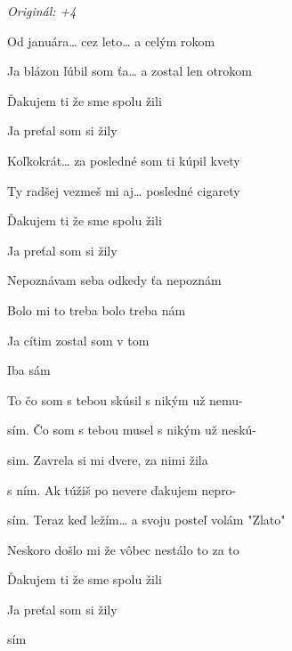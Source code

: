 \begin{song}


\begin{strumbox}
\textit{Originál: +4}
\end{strumbox}

\begin{hchordbox}
\end{hchordbox}

\Large

\bigskip


 Od januára… cez leto… a celým rokom \par
{} Ja blázon ľúbil som ťa… a zostal len otrokom \par
{}Ďakujem ti že sme spolu žili \par
Ja preťal som si žily \par

\bigskip

 Koľkokrát… za posledné som ti kúpil kvety \par
{} Ty radšej vezmeš mi aj… posledné cigarety \par
{}Ďakujem ti že sme spolu žili \par
Ja preťal som si žily \par

\bigskip

\begin{chorusbox}{\PredrefrenARefren}
Nepoznávam seba odkedy ťa nepoznám \par
{} Bolo mi to treba  bolo treba nám \par
{} Ja cítim zostal som v tom \par
Iba sám \par

\bigskip

 To čo som s tebou skúsil  s nikým už nemu- \par
{}sím. Čo som s tebou musel  s nikým už neskú- \par
{}sim. Zavrela si mi dvere,  za nimi žila \par
{}s ním. Ak túžiš po nevere  ďakujem nepro- \par
\end{chorusbox}

\bigskip

sím. Teraz keď ležím… a svoju posteľ volám "Zlato" \par
{} Neskoro došlo mi že vôbec nestálo to za to \par
{}Ďakujem ti že sme spolu žili \par
Ja preťal som si žily \par

\bigskip

\PredrefrenARefren

\bigskip

sím


\end{song}